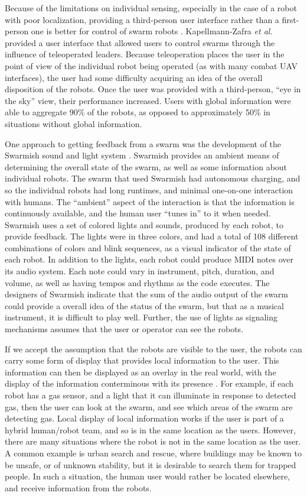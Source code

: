 Because of the limitations on individual sensing, especially in the case of a robot with poor localization, providing a third-person user interface rather than a first-person one is better for control of swarm robots \citep{kapellmann2016human}. 
Kapellmann-Zafra \emph{et al.} provided a user interface that allowed users to control swarms through the influence of teleoperated leaders. 
Because teleoperation places the user in the point of view of the individual robot being operated (as with many combat UAV interfaces), the user had some difficulty acquiring an idea of the overall disposition of the robots. 
Once the user was provided with a third-person, ``eye in the sky'' view, their performance increased. 
Users with global information were able to aggregate 90\% of the robots, as opposed to approximately 50\% in situations without global information. 

One approach to getting feedback from a swarm was the development of the Swarmish sound and light system \citep{mclurkin2006speaking}. 
Swarmish provides an ambient means of determining the overall state of the swarm, as well as some information about individual robots. 
The swarm that used Swarmish had autonomous charging, and so the individual robots had long runtimes, and minimal one-on-one interaction with humans. 
The ``ambient'' aspect of the interaction is that the information is continuously available, and the human user ``tunes in'' to it when needed. 
Swarmish uses a set of colored lights and sounds, produced by each robot, to provide feedback. 
The lights were in three colors, and had a total of 108 different combinations of colors and blink sequences, as a visual indicator of the state of each robot. 
In addition to the lights, each robot could produce MIDI notes over its audio system. 
Each note could vary in instrument, pitch, duration, and volume, as well as having tempos and rhythms as the code executes. 
The designers of Swarmish indicate that the sum of the audio output of the swarm could provide a overall idea of the status of the swarm, but that as a musical instrument, it is difficult to play well. 
Further, the use of lights as signaling mechanisms assumes that the user or operator can see the robots. 

If we accept the assumption that the robots are visible to the user, the robots can carry some form of display that provides local information to the user. 
This information can then be displayed as an overlay in the real world, with the display of the information conterminous with its presence \citep{Daily:2003:WEI:820752.821587}. 
For example, if each robot has a gas sensor, and a light that it can illuminate in response to detected gas, then the user can look at the swarm, and see which areas of the swarm are detecting gas.
Local display of local information works if the user is part of a hybrid human/robot team, and so is in the same location as the users. 
However, there are many situations where the robot is not in the same location as the user. 
A common example is urban search and rescue, where buildings may be known to be unsafe, or of unknown stability, but it is desirable to search them for trapped people. 
In such a situation, the human user would rather be located elsewhere, and receive information from the robots. 


